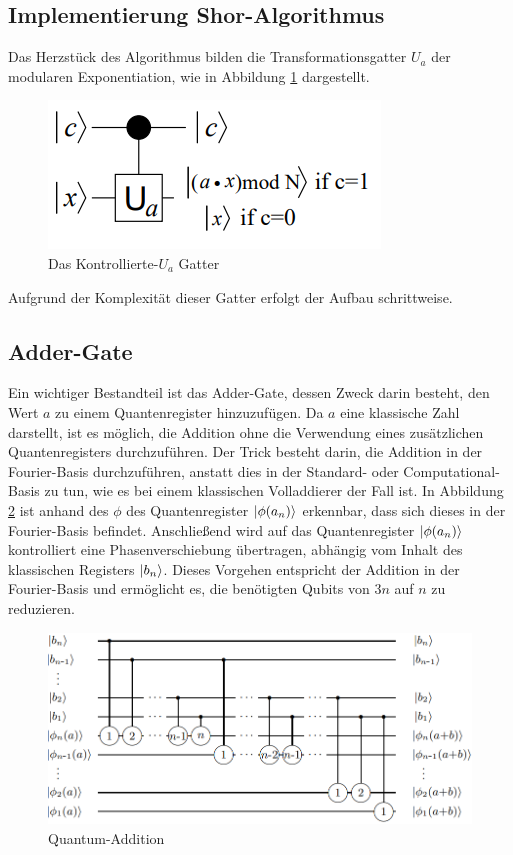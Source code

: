 \documentclass[
  a4paper, %
  10pt, %
  unnumberedsections, %
  twoside, %
]{LTJournalArticle}
\begin{document}
\subsection{\Large Implementierung Shor-Algorithmus}
Das Herzstück des Algorithmus bilden die Transformationsgatter $U_a$ der modularen Exponentiation,
wie in Abbildung \ref{fig:c-Ugate} dargestellt.
\begin{figure}[h]
\caption{Das Kontrollierte-$U_a$ Gatter~\autocite{beauregard2003circuit}}
\label{fig:c-Ugate}
\includegraphics[scale=0.8]{c-Ugate.PNG}
\centering
\end{figure}
Aufgrund der Komplexität dieser Gatter erfolgt der Aufbau schrittweise.
\subsection{\large Adder-Gate}
Ein wichtiger Bestandteil ist das Adder-Gate, dessen Zweck darin besteht,
den Wert $a$ zu einem Quantenregister hinzuzufügen.
Da $a$ eine klassische Zahl darstellt, ist es möglich,
die Addition ohne die Verwendung eines zusätzlichen Quantenregisters durchzuführen.
Der Trick besteht darin, die Addition in der Fourier-Basis durchzuführen,
anstatt dies in der Standard- oder Computational-Basis zu tun,
wie es bei einem klassischen Volladdierer der Fall ist.
In Abbildung \ref{fig:Quantum-Addition} ist anhand des $\phi$ des Quantenregister $\ket{\phi(a_n)}$ erkennbar,
dass sich dieses in der Fourier-Basis befindet.
Anschließend wird auf das Quantenregister $\ket{\phi(a_n)}$ kontrolliert eine Phasenverschiebung übertragen,
abhängig vom Inhalt des klassischen Registers $\ket{b_n}$.
Dieses Vorgehen entspricht der Addition in der Fourier-Basis und ermöglicht es,
die benötigten Qubits von $3n$ auf $n$ zu reduzieren.
\begin{figure}[h]
\caption{Quantum-Addition~\autocite{draper2000addition}}
\label{fig:Quantum-Addition}
\includegraphics[scale=0.4]{Quantum-Addition.PNG}
\centering
\end{figure}
\end{document}
